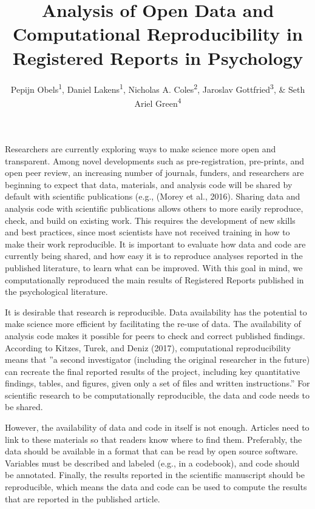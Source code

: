 \documentclass[,jou, a4paper,floatsintext]{apa6}
\title{Analysis of Open Data and Computational Reproducibility in Registered Reports in Psychology}
\author{Pepijn Obels\textsuperscript{1}, Daniel Lakens\textsuperscript{1}, Nicholas A. Coles\textsuperscript{2}, Jaroslav Gottfried\textsuperscript{3}, \& Seth Ariel Green\textsuperscript{4}}
\date{}
\affiliation{
\vspace{0.5cm}
\textsuperscript{1} Eindhoven University of Technology, The Netherlands\\\textsuperscript{2} University of Tennessee, Knoxville, USA\\\textsuperscript{3} Masaryk University, Brno, Czech Republic\\\textsuperscript{4} Code Ocean, New York, USA}
\begin{document}
\maketitle

Researchers are currently exploring ways to make science more open and transparent. Among novel developments such as pre-registration, pre-prints, and open peer review, an increasing number of journals, funders, and researchers are beginning to expect that data, materials, and analysis code will be shared by default with scientific publications (e.g., (Morey et al., 2016). Sharing data and analysis code with scientific publications allows others to more easily reproduce, check, and build on existing work. This requires the development of new skills and best practices, since most scientists have not received training in how to make their work reproducible. It is important to evaluate how data and code are currently being shared, and how easy it is to reproduce analyses reported in the published literature, to learn what can be improved. With this goal in mind, we computationally reproduced the main results of Registered Reports published in the psychological literature.

It is desirable that research is reproducible. Data availability has the potential to make science more efficient by facilitating the re-use of data. The availability of analysis code makes it possible for peers to check and correct published findings. According to Kitzes, Turek, and Deniz (2017), computational reproducibility means that ''a second investigator (including the original researcher in the future) can recreate the final reported results of the project, including key quantitative findings, tables, and figures, given only a set of files and written instructions.'' For scientific research to be computationally reproducible, the data and code needs to be shared.

However, the availability of data and code in itself is not enough. Articles need to link to these materials so that readers know where to find them. Preferably, the data should be available in a format that can be read by open source software. Variables must be described and labeled (e.g., in a codebook), and code should be annotated. Finally, the results reported in the scientific manuscript should be reproducible, which means the data and code can be used to compute the results that are reported in the published article.
\end{document}
